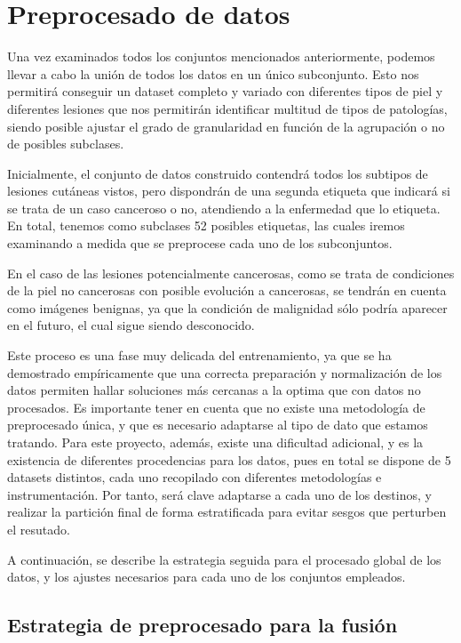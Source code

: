 \chapter{Preprocesado de datos}


Una vez examinados todos los conjuntos mencionados anteriormente, podemos llevar a cabo la unión de todos los datos en un único subconjunto. Esto nos permitirá conseguir un dataset completo y variado con diferentes tipos de piel y diferentes lesiones que nos permitirán identificar multitud de tipos de patologías, siendo posible ajustar el grado de granularidad en función de la agrupación o no de posibles subclases.

Inicialmente, el conjunto de datos construido contendrá todos los subtipos de lesiones cutáneas vistos, pero dispondrán de una segunda etiqueta que indicará si se trata de un caso canceroso o no, atendiendo a la enfermedad que lo etiqueta. En total, tenemos como subclases 52 posibles etiquetas, las cuales iremos examinando a medida que se preprocese cada uno de los subconjuntos.

En el caso de las lesiones potencialmente cancerosas, como se trata de condiciones de la piel no cancerosas con posible evolución a cancerosas, se tendrán en cuenta como imágenes benignas, ya que la condición de malignidad sólo podría aparecer en el futuro, el cual sigue siendo desconocido.

Este proceso es una fase muy delicada del entrenamiento, ya que se ha demostrado empíricamente que una correcta preparación y normalización de los datos permiten hallar soluciones más cercanas a la optima que con datos no procesados. Es importante tener en cuenta que no existe una metodología de preprocesado única, y que es necesario adaptarse al tipo de dato que estamos tratando. Para este proyecto, además, existe una dificultad adicional, y es la existencia de diferentes procedencias para los datos, pues en total se dispone de 5 datasets distintos, cada uno recopilado con diferentes metodologías e instrumentación. Por tanto, será clave adaptarse a cada uno de los destinos, y realizar la partición final de forma estratificada para evitar sesgos que perturben el resutado.

A continuación, se describe la estrategia seguida para el procesado global de los datos, y los ajustes necesarios para cada uno de los conjuntos empleados.

\section{Estrategia de preprocesado para la fusión}

